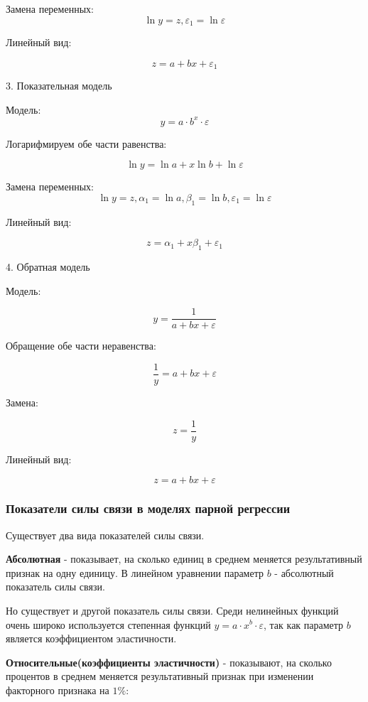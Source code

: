 \documentclass[aps,%
12pt,%
final,%
oneside,
onecolumn,%
musixtex, %
superscriptaddress,%
centertags]{article} %
\begin{document}
Замена переменных:
$$ \ln y = z, \varepsilon_1 = \ln \varepsilon $$

Линейный вид:

$$ z = a + bx + \varepsilon_1 $$

\begin{center} 3. Показательная модель \end{center}

Модель:
$$ y = a \cdot b^x \cdot \varepsilon $$

Логарифмируем обе части равенства:

$$ \ln y = \ln a + x \ln b + \ln \varepsilon$$

Замена переменных:
$$ \ln y = z, \alpha_1 = \ln a, \beta_1 = \ln b, \varepsilon_1 = \ln \varepsilon $$

Линейный вид:

$$ z = \alpha_1 + x\beta_1 + \varepsilon_1 $$

\begin{center} 4. Обратная модель \end{center}

Модель:

$$ y = \frac{1}{a+bx+\varepsilon} $$

Обращение обе части неравенства:

$$ \frac{1}{y} = a + bx + \varepsilon $$

Замена:

$$ z =\frac{1}{y} $$

Линейный вид:

$$ z = a + bx + \varepsilon $$

\subsubsection{Показатели силы связи в моделях парной регрессии}

Существует два вида показателей силы связи.

\textbf{Абсолютная} - показывает, на сколько единиц в среднем меняется результативный признак на одну единицу. В линейном уравнении параметр $b$ - абсолютный показатель силы связи.

Но существует и другой показатель силы связи. Среди нелинейных функций очень широко используется степенная функций $ y = a \cdot x^b \cdot \varepsilon $, так как параметр $b$ является коэффициентом эластичности.

\textbf{Относительные(коэффициенты эластичности)} - показывают, на сколько процентов в среднем меняется результативный признак при изменении факторного признака на $1\%$:
\end{document}
